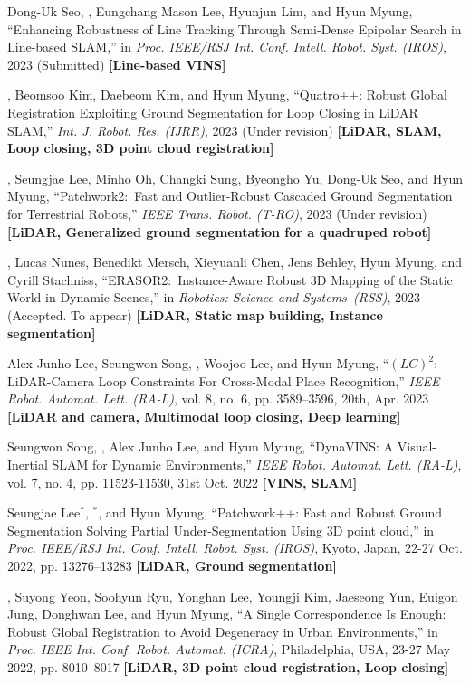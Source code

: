 \documentclass[11pt, a4paper]{../awesome-cv}
\begin{document}
\begin{cvletter}
	\begin{pubSubsectionNum}
		\item Dong-Uk Seo, \hyungtaelim, Eungchang Mason Lee, Hyunjun Lim, and Hyun Myung, ``Enhancing Robustness of Line Tracking Through Semi-Dense Epipolar Search in Line-based SLAM,'' in \textit{Proc. IEEE/RSJ Int. Conf. Intell. Robot. Syst. (IROS)}, 2023 (Submitted) \textbf{[Line-based VINS]}
    \item {\hyungtaelim, Beomsoo Kim, Daebeom Kim, and Hyun Myung, ``Quatro++: Robust Global Registration Exploiting Ground Segmentation for Loop Closing in LiDAR SLAM,'' \textit{Int. J. Robot. Res. (IJRR)}, 2023 (Under revision) \textbf{[LiDAR, SLAM, Loop closing, 3D point cloud registration]}}
    \item {\hyungtaelim, Seungjae Lee, Minho Oh, Changki Sung, Byeongho Yu, Dong-Uk Seo, and Hyun Myung, ``Patchwork2:~Fast and Outlier-Robust Cascaded Ground Segmentation for Terrestrial Robots,'' \textit{IEEE Trans. Robot. (T-RO)}, 2023 (Under revision)} \textbf{[LiDAR, Generalized ground segmentation for a quadruped robot]}
	\item \hyungtaelim, Lucas Nunes, Benedikt Mersch, Xieyuanli Chen, Jens Behley, Hyun Myung, and Cyrill Stachniss, ``ERASOR2:~Instance-Aware Robust 3D Mapping of the Static World in Dynamic Scenes,'' in \textit{Robotics: Science and Systems~(RSS)}, 2023 (Accepted. To appear) \textbf{[LiDAR, Static map building, Instance segmentation]}
    \item Alex Junho Lee, Seungwon Song, \hyungtaelim, Woojoo Lee, and Hyun Myung, ``$(LC)^2$: LiDAR-Camera Loop Constraints For Cross-Modal Place Recognition,'' \textit{IEEE Robot. Automat. Lett. (RA-L)}, vol. 8, no. 6, pp. 3589--3596, 20th, Apr. 2023 \textbf{[LiDAR and camera, Multimodal loop closing, Deep learning]}
    \item Seungwon Song, \hyungtaelim, Alex Junho Lee, and Hyun Myung, ``DynaVINS: A Visual-Inertial SLAM for Dynamic Environments,'' \textit{IEEE Robot. Automat. Lett. (RA-L)}, vol. 7, no. 4, pp. 11523-11530, 31st Oct. 2022 \textbf{[VINS, SLAM]}
    \item Seungjae Lee$^*$, \hyungtaelim$^*$, and Hyun Myung, ``Patchwork++: Fast and Robust Ground Segmentation Solving Partial Under-Segmentation Using 3D point cloud,'' in \textit{Proc. IEEE/RSJ Int. Conf. Intell. Robot. Syst. (IROS)}, Kyoto, Japan, 22-27 Oct. 2022, pp. 13276--13283 \textbf{[LiDAR, Ground segmentation]}
    \item \hyungtaelim, Suyong Yeon, Soohyun Ryu, Yonghan Lee, Youngji Kim, Jaeseong Yun, Euigon Jung, Donghwan Lee, and Hyun Myung, ``A Single Correspondence Is Enough: Robust Global Registration to Avoid Degeneracy in Urban Environments,'' in \textit{Proc. IEEE Int. Conf. Robot. Automat. (ICRA)}, Philadelphia, USA, 23-27 May 2022, pp. 8010--8017 \textbf{[LiDAR, 3D point cloud registration, Loop closing]}

\end{pubSubsectionNum}
\end{cvletter}
\end{document}
